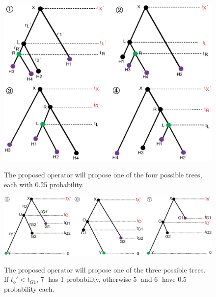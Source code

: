 \documentclass{bmcart}
\begin{document}
\begin{backmatter}
%
\begin{figure}[h!]
\includegraphics[width=12cm]{Fig06-symmetric.eps}\\
\caption{
             The proposed operator will propose one of the four possible trees, each with 0.25 probability.}
\label{symmetric}
\end{figure}

\begin{figure}[h!]
\includegraphics[width=12cm]{Fig07-asymmetric.eps}\\
\caption{
             The proposed operator will propose one of the three possible trees. If ${t_o}' < t_{G1}$, \textcircled7 has 1 probability, otherwise \textcircled5 and \textcircled6 have 0.5 probability each.}
\label{asymmetric}
\end{figure}


\end{backmatter}
\end{document}
